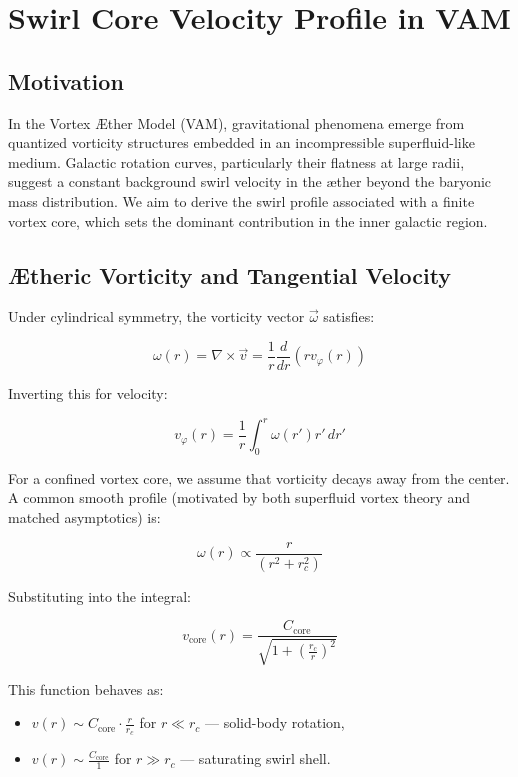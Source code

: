 \documentclass[12pt]{article}
\begin{document}
\section{Swirl Core Velocity Profile in VAM}
\label{appendix:swirl-core}

\subsection{Motivation}

In the Vortex \AE{}ther Model (VAM), gravitational phenomena emerge from quantized vorticity structures embedded in an incompressible superfluid-like medium. Galactic rotation curves, particularly their flatness at large radii, suggest a constant background swirl velocity in the æther beyond the baryonic mass distribution. We aim to derive the swirl profile associated with a finite vortex core, which sets the dominant contribution in the inner galactic region.

\subsection{Ætheric Vorticity and Tangential Velocity}

Under cylindrical symmetry, the vorticity vector \( \vec{\omega} \) satisfies:

\[
\omega(r) = \nabla \times \vec{v} = \frac{1}{r} \frac{d}{dr} \left( r v_\varphi(r) \right)
\]

Inverting this for velocity:

\[
v_\varphi(r) = \frac{1}{r} \int_0^r \omega(r') r' \, dr'
\]

For a confined vortex core, we assume that vorticity decays away from the center. A common smooth profile (motivated by both superfluid vortex theory and matched asymptotics) is:

\[
\omega(r) \propto \frac{r}{(r^2 + r_c^2)}
\]

Substituting into the integral:

\[
v_\text{core}(r) = \frac{C_{\text{core}}}{\sqrt{1 + \left( \frac{r_c}{r} \right)^2 }}
\]

This function behaves as:
\begin{itemize}
    \item \( v(r) \sim C_{\text{core}} \cdot \frac{r}{r_c} \) for \( r \ll r_c \) — solid-body rotation,
    \item \( v(r) \sim \frac{C_{\text{core}}}{1} \) for \( r \gg r_c \) — saturating swirl shell.
\end{itemize}
\end{document}
